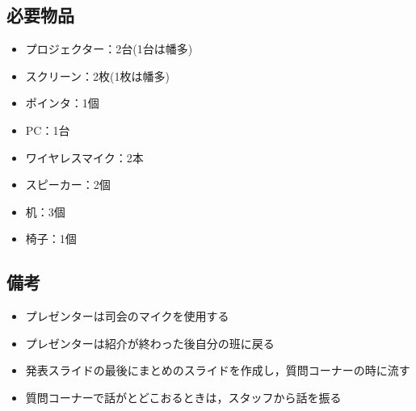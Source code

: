 \documentclass[a4j,titlepage]{jarticle}
\begin{document}
\subsection{必要物品}
 \begin{itemize}
 \item プロジェクター：2台(1台は幡多)
 \item スクリーン：2枚(1枚は幡多)
 \item ポインタ：1個
 \item PC：1台
 \item ワイヤレスマイク：2本
 \item スピーカー：2個
 \item 机：3個
 \item 椅子：1個
 \end{itemize}

\subsection{備考}
 \begin{itemize}
 \item プレゼンターは司会のマイクを使用する
 \item プレゼンターは紹介が終わった後自分の班に戻る
 \item 発表スライドの最後にまとめのスライドを作成し，質問コーナーの時に流す
 \item 質問コーナーで話がとどこおるときは，スタッフから話を振る
 \end{itemize}

%
\end{document}
